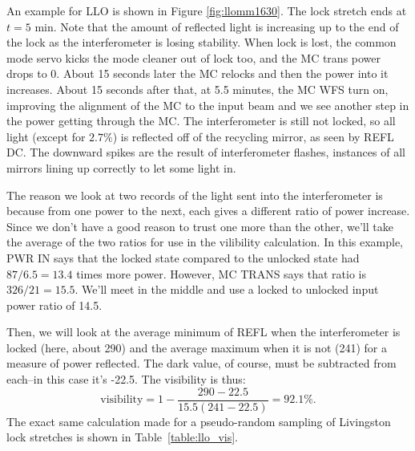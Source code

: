 An example for LLO is shown in Figure \ref{fig:llomm1630}. The lock
stretch ends at $t=5$ min. Note that the amount of reflected light is 
increasing up to the end of the lock as the interferometer is losing
stability. When lock is lost, the common mode servo kicks the mode
cleaner out of lock too, and the MC trans power drops to 0. About 15 seconds later the MC relocks and then
the power into it increases. About 15 seconds after that, at 5.5 minutes, the MC WFS turn
on, improving the alignment of the MC to the input beam and we
see another step in the power getting through the MC. The
interferometer is still not locked, so all light (except for $2.7\%$) is reflected off of
the recycling mirror, as seen by REFL DC. The downward spikes are the
result of interferometer flashes, instances of all mirrors lining up
correctly to let some light in. 

The reason we look at two records of the light sent into the
interferometer is because from one power to the next, each gives a
different ratio of power increase. Since we don't
have a good reason to trust one more than the other, we'll take the
average of the two ratios for use in the vilibility calculation. In
this example, PWR IN says that the locked state compared to the
unlocked state had $87/6.5 = 13.4$ times more power. However, MC TRANS
says that ratio is $326/21 = 15.5$. We'll meet in the middle and use a
locked to unlocked input power ratio of 14.5. 

Then, we will look at the average minimum of REFL when the
interferometer is locked (here, about 290) and the average maximum
when it is not (241) for a measure of power reflected. The dark value,
of course, must be subtracted from each--in this case it's -22.5. The
visibility is thus:
\begin{equation}
\mathrm{visibility} = 1 - \frac{290-22.5}{15.5(241-22.5)} = 92.1\%.
\end{equation}
The exact same calculation made for a pseudo-random sampling of
Livingston lock stretches is shown in Table~\ref{table:llo_vis}.

